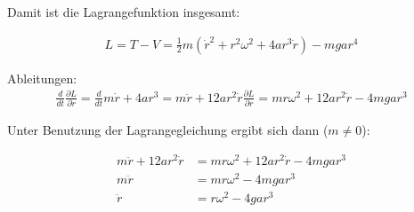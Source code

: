 \documentclass[a4paper,german,12pt,smallheadings]{scrartcl}
\begin{document}
Damit ist die Lagrangefunktion insgesamt:

\begin{align*}
  L = T - V = \frac{1}{2}m(\dot{r}^2 + r^2\omega^2 + 4ar^3\dot{r}) - mgar^4
\end{align*}

Ableitungen:
\begin{align*}
  \frac{d}{dt} \frac{\partial L}{\partial \dot{r}} = \frac{d}{dt} m\dot{r} + 4ar^3 = m\ddot{r} + 12ar^2\dot{r}
  \frac{\partial L}{\partial r} = mr\omega^2+12ar^2\dot{r} - 4mgar^3
\end{align*}

Unter Benutzung der Lagrangegleichung ergibt sich dann ($m \neq 0$):

\begin{align*}
  m\ddot{r} + 12ar^2\dot{r} &=  mr\omega^2 + 12ar^2\dot{r} - 4mgar^3 \\
  m\ddot{r} &= mr\omega^2 - 4mgar^3 \\
  \ddot{r} &= r\omega^2 - 4gar^3
\end{align*}
\end{document}
